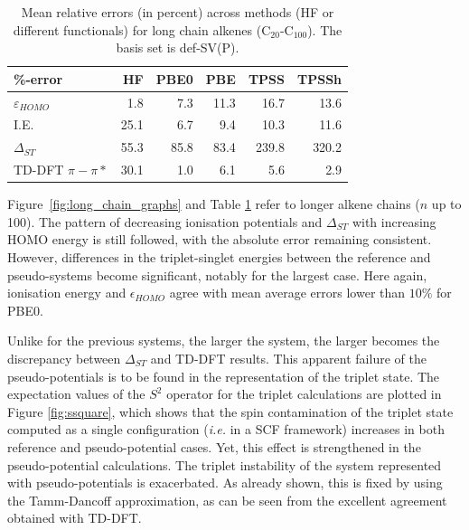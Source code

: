 \documentclass[aip]{revtex4-1}
\begin{document}
\begin{table}[ht]
\caption{Mean relative errors (in percent) across methods (HF or different functionals)
for long chain alkenes (C\(_{20}\)-C\(_{100}\)).
The basis set is def-SV(P).}
\begin{tabular}{l r r r r r }
\hline\hline
\%-error          & HF & PBE0 & PBE & TPSS & TPSSh \\
\hline
$\varepsilon_{HOMO}$    &  1.8 &  7.3   &  11.3   &  16.7    &  13.6 \\
I.E.                    & 25.1 &  6.7   &   9.4   &  10.3    &  11.6 \\
$\Delta_{ST}$           & 55.3 & 85.8   &  83.4   & 239.8    & 320.2 \\
TD-DFT $\pi-\pi*$       & 30.1 &  1.0   &   6.1   &   5.6    &   2.9 \\ 
\hline\hline
\end{tabular}
\label{table:long_alkene_errors}
\end{table}

Figure~\ref{fig:long_chain_graphs} and Table \ref{table:long_alkene_errors} refer to longer 
alkene chains (\(n\) up to 100).
The pattern of decreasing ionisation potentials and $\Delta_{ST}$ with increasing HOMO
energy is still followed, with the absolute error remaining consistent.
However, differences in the triplet-singlet energies between the reference and pseudo-systems 
become significant, notably for the largest case.
Here again, ionisation energy and $\epsilon_{HOMO}$ agree with mean average errors lower than
$10\%$ for PBE0.

Unlike for the previous systems, the larger the system, the larger becomes the discrepancy between $\Delta_{ST}$
and TD-DFT results.
This apparent failure of the pseudo-potentials is to be found in the representation
of the triplet state.
The expectation values of the $S^2$ operator for the triplet calculations
are plotted in Figure \ref{fig:ssquare}, which shows that the spin contamination
of the triplet state computed as a single configuration (\emph{i.e.} in a SCF
framework) increases in both reference and pseudo-potential cases.
Yet, this effect is strengthened in the pseudo-potential calculations.
The triplet instability of the system represented with pseudo-potentials
is exacerbated.
As already shown, this is fixed by using the Tamm-Dancoff approximation,
as can be seen from the excellent agreement obtained with TD-DFT.\cite{tammdancoff}
\end{document}
